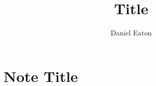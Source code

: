 \documentclass{article}
\title{Title}
\author{Daniel Eaton}
\begin{document}
\maketitle
\newpage
\tableofcontents
\newpage%
\section{Note Title}
\afterpage{\null\newpage} %
\newpage %
\printindex%
\end{document}
